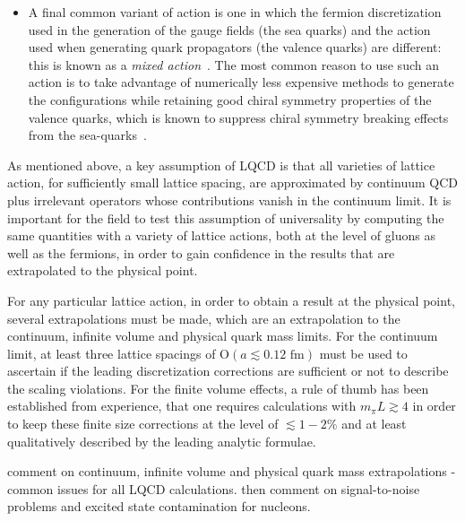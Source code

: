 \begin{itemize}[leftmargin=*]
\item A final common variant of action is one in which the fermion discretization used in the generation of the gauge fields (the sea quarks) and the action used when generating quark propagators (the valence quarks) are different: this is known as a \textit{mixed action}~\cite{Renner:2004ck}.
The most common reason to use such an action is to take advantage of numerically less expensive methods to generate the configurations while retaining good chiral symmetry properties of the valence quarks, which is known to suppress chiral symmetry breaking effects from the sea-quarks~\cite{Bar:2002nr,Bar:2005tu,Tiburzi:2005is,Chen:2007ug}.

\end{itemize}
As mentioned above, a key assumption of LQCD is that all varieties of lattice action, for sufficiently small lattice spacing, are approximated by continuum QCD plus irrelevant operators whose contributions vanish in the continuum limit.
It is important for the field to test this assumption of universality by computing the same quantities with a variety of lattice actions, both at the level of gluons as well as the fermions, in order to gain confidence in the results that are extrapolated to the physical point.

For any particular lattice action, in order to obtain a result at the physical point, several extrapolations must be made, which are an extrapolation to the continuum, infinite volume and physical quark mass limits.
For the continuum limit, at least three lattice spacings of $\mathrm{O}(a\lesssim0.12\textrm{ fm})$ must be used to ascertain if the leading discretization corrections are sufficient or not to describe the scaling violations.
For the finite volume effects, a rule of thumb has been established from experience, that one requires calculations with $m_\pi L \gtrsim4$ in order to keep these finite size corrections at the level of $\lesssim1-2\%$ and at least qualitatively described by the leading analytic formulae.




{\color{red}comment on continuum, infinite volume and physical quark mass extrapolations - common issues for all LQCD calculations.  then comment on signal-to-noise problems and excited state contamination for nucleons.}
